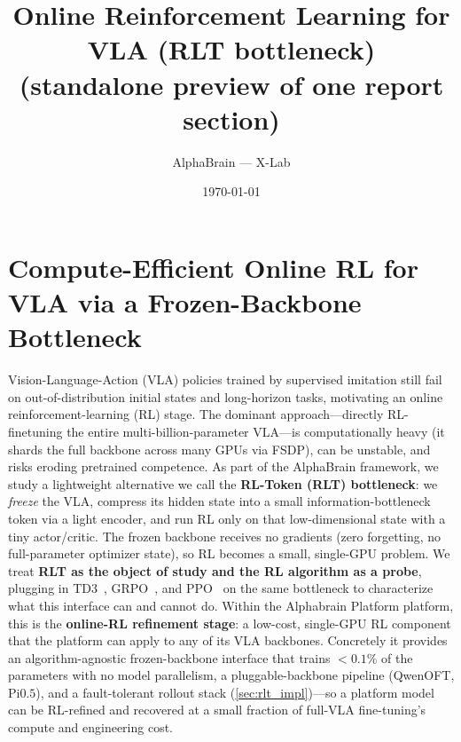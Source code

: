 \documentclass[11pt]{article}
\title{\textbf{Online Reinforcement Learning for VLA (RLT bottleneck)}\\[2pt]\large (standalone preview of one report section)}
\author{AlphaBrain --- X-Lab}\date{\today}
\newcommand{\platform}{Alphabrain Platform}\newcommand{\model}{Alphabrain}
\begin{document}
\maketitle
\newcommand{\sotbd}{\textcolor{black!35}{$\dagger$}} %


\section{Compute-Efficient Online RL for VLA via a Frozen-Backbone Bottleneck}
\label{sec:rlt}

Vision-Language-Action (VLA) policies trained by supervised imitation still fail on out-of-distribution initial states and long-horizon tasks, motivating an online reinforcement-learning (RL) stage. The dominant approach---directly RL-finetuning the entire multi-billion-parameter VLA---is computationally heavy (it shards the full backbone across many GPUs via FSDP), can be unstable, and risks eroding pretrained competence. As part of the AlphaBrain framework, we study a lightweight alternative we call the \textbf{RL-Token (RLT) bottleneck}: we \emph{freeze} the VLA, compress its hidden state into a small information-bottleneck token via a light encoder, and run RL only on that low-dimensional state with a tiny actor/critic. The frozen backbone receives no gradients (zero forgetting, no full-parameter optimizer state), so RL becomes a small, single-GPU problem. We treat \textbf{RLT as the object of study and the RL algorithm as a probe}, plugging in TD3~\citep{fujimoto2018td3}, GRPO~\citep{shao2024grpo}, and PPO~\citep{schulman2017ppo} on the same bottleneck to characterize what this interface can and cannot do. Within the \platform{} platform, this is the \textbf{online-RL refinement stage}: a low-cost, single-GPU RL component that the platform can apply to any of its VLA backbones. Concretely it provides an algorithm-agnostic frozen-backbone interface that trains $<0.1\%$ of the parameters with no model parallelism, a pluggable-backbone pipeline (QwenOFT, Pi$0.5$), and a fault-tolerant rollout stack (\cref{sec:rlt_impl})---so a platform model can be RL-refined and recovered at a small fraction of full-VLA fine-tuning's compute and engineering cost.
\end{document}
